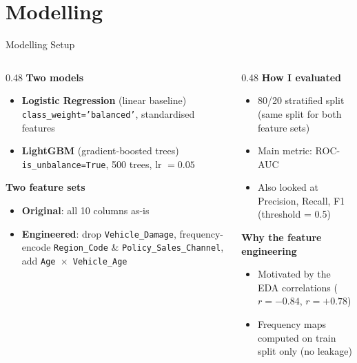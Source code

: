\documentclass[aspectratio=169, 10pt]{beamer}
\begin{document}
\section{Modelling}

\begin{frame}{Modelling Setup}
  \begin{columns}[T]
    \begin{column}{0.48\textwidth}
      \textbf{Two models}
      \begin{itemize}
        \item \textbf{Logistic Regression} (linear baseline) \\
              {\small \texttt{class\_weight='balanced'}, standardised features}
        \item \textbf{LightGBM} (gradient-boosted trees) \\
              {\small \texttt{is\_unbalance=True}, 500 trees, lr $= 0.05$}
      \end{itemize}

      \vspace{0.4cm}
      \textbf{Two feature sets}
      \begin{itemize}
        \item \textbf{Original}: all 10 columns as-is
        \item \textbf{Engineered}: drop \texttt{Vehicle\_Damage}, frequency-encode
              \texttt{Region\_Code} \& \texttt{Policy\_Sales\_Channel},
              add \texttt{Age $\times$ Vehicle\_Age}
      \end{itemize}
    \end{column}
    \begin{column}{0.48\textwidth}
      \textbf{How I evaluated}
      \begin{itemize}
        \item 80/20 stratified split (same split for both feature sets)
        \item Main metric: ROC-AUC
        \item Also looked at Precision, Recall, F1 (threshold = 0.5)
      \end{itemize}

      \vspace{0.4cm}
      \textbf{Why the feature engineering}
      \begin{itemize}
        \item Motivated by the EDA correlations ($r=-0.84$, $r=+0.78$)
        \item Frequency maps computed on train split only (no leakage)
      \end{itemize}
    \end{column}
  \end{columns}
\end{frame}
\end{document}
